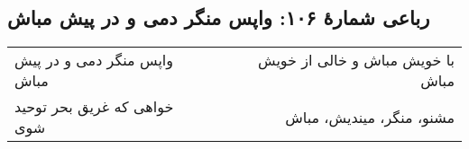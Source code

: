 \begin{center}
\section*{رباعی شمارهٔ ۱۰۶: واپس منگر دمی و در پیش مباش}
\label{sec:106}
\begin{longtable}{l p{0.5cm} r}
واپس منگر دمی و در پیش مباش
&&
با خویش مباش و خالی از خویش مباش
\\
خواهی که غریق بحر توحید شوی
&&
مشنو، منگر، میندیش، مباش
\\
\end{longtable}
\end{center}
